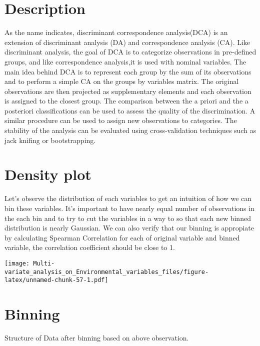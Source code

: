 \documentclass[]{book}
\begin{document}
\hypertarget{description-3}{%
\section{Description}\label{description-3}}

As the name indicates, discriminant correspondence analysis(DCA) is an
extension of discriminant analysis (DA) and correspondence analysis
(CA). Like discriminant analysis, the goal of DCA is to categorize
observations in pre-deﬁned groups, and like correspondence analysis,it
is used with nominal variables. The main idea behind DCA is to represent
each group by the sum of its observations and to perform a simple CA on
the groups by variables matrix. The original observations are then
projected as supplementary elements and each observation is assigned to
the closest group. The comparison between the a priori and the a
posteriori classiﬁcations can be used to assess the quality of the
discrimination. A similar procedure can be used to assign new
observations to categories. The stability of the analysis can be
evaluated using cross-validation techniques such as jack kniﬁng or
bootstrapping.

\hypertarget{density-plot-1}{%
\section{Density plot}\label{density-plot-1}}

Let's observe the distribution of each variables to get an intuition of
how we can bin these variables. It's important to have nearly equal
number of observations in the each bin and to try to cut the variables
in a way to so that each new binned distribution is nearly Gaussian. We
can also verify that our binning is appropiate by calculating Spearman
Correlation for each of original variable and binned variable, the
correlation coefficient should be close to 1.

\texttt{[image: Multi-variate\_analysis\_on\_Environmental\_variables\_files/figure-latex/unnamed-chunk-57-1.pdf]}

\hypertarget{binning-1}{%
\section{Binning}\label{binning-1}}

Structure of Data after binning based on above observation.
\end{document}
